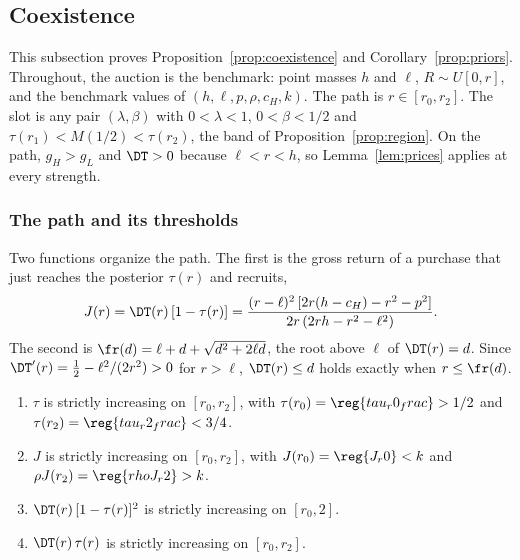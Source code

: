 \subsection{Coexistence}\label{app:coexistence}

This subsection proves Proposition~\ref{prop:coexistence} and Corollary~\ref{prop:priors}. Throughout, the auction is the
benchmark: point masses \(h\) and \(\ell\), \(R\sim U[0,r]\), and the benchmark values of
\((h,\ell,p,\rho,c_H,k)\). The path is \(r\in[r_0,r_2]\). The slot is any pair \((\lambda,\beta)\) with
\(0<\lambda<1\), \(0<\beta<1/2\) and \(\tau(r_1)<M(1/2)<\tau(r_2)\), the band of Proposition~\ref{prop:region}. On
the path, \(g_H>g_L\) and \(\DT>0\) because \(\ell<r<h\), so Lemma~\ref{lem:prices} applies at every strength.

\subsubsection*{The path and its thresholds}

Two functions organize the path. The first is the gross return of a purchase that just reaches the posterior
\(\tau(r)\) and recruits,
\[
J(r)=\DT(r)\,[1-\tau(r)]=\frac{(r-\ell)^2\,[2r(h-c_H)-r^2-p^2]}{2r\,(2rh-r^2-\ell^2)} .
\]
The second is \(\fr(d)=\ell+d+\sqrt{d^2+2\ell d}\), the root above \(\ell\) of \(\DT(r)=d\). Since
\(\DT'(r)=\frac12-\ell^2/(2r^2)>0\) for \(r>\ell\), \(\DT(r)\le d\) holds exactly when \(r\le\fr(d)\).

\begin{lemma}\label{lem:a4-path}
\begin{enumerate}[label=(\alph*),leftmargin=2em]
\item \(\tau\) is strictly increasing on \([r_0,r_2]\), with \(\tau(r_0)=\reg{tau_r0_frac}>1/2\) and
\(\tau(r_2)=\reg{tau_r2_frac}<3/4\).
\item \(J\) is strictly increasing on \([r_0,r_2]\), with \(J(r_0)=\reg{J_r0}<k\) and
\(\rho J(r_2)=\reg{rhoJ_r2}>k\).
\item \(\DT(r)\,[1-\tau(r)]^2\) is strictly increasing on \([r_0,2]\).
\item \(\DT(r)\,\tau(r)\) is strictly increasing on \([r_0,r_2]\).
\end{enumerate}
\end{lemma}

